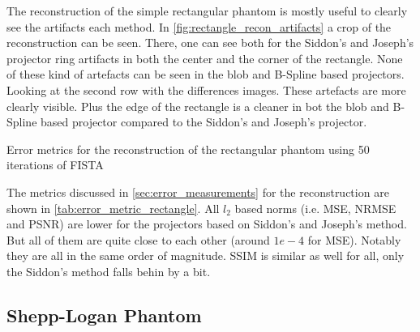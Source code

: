The reconstruction of the simple rectangular phantom is mostly useful to clearly see the artifacts
each method. In \autoref{fig:rectangle_recon_artifacts} a crop of the reconstruction can be seen.
There, one can see both for the Siddon's and Joseph's projector ring artifacts in both the center
and the corner of the rectangle. None of these kind of artefacts can be seen in the blob and
B-Spline based projectors. Looking at the second row with the differences images. These artefacts
are more clearly visible. Plus the edge of the rectangle is a cleaner in bot the blob and B-Spline
based projector compared to the Siddon's and Joseph's projector.

\begin{table}[h]%
	\centering
	\caption{Error metrics for the reconstruction of the rectangular phantom using 50 iterations
		of FISTA}%
	\label{tab:error_metric_rectangle}
\end{table}

The metrics discussed in \autoref{sec:error_measurements} for the reconstruction are shown in
\autoref{tab:error_metric_rectangle}. All \(l_2\) based norms (i.e. \gls{MSE}, \gls{NRMSE} and
\gls{PSNR}) are lower for the projectors based on Siddon's and Joseph's method. But all of them are
quite close to each other (around \(1e-4\) for \gls{MSE}). Notably they are all in the same order of
magnitude. \gls{SSIM} is similar as well for all, only the Siddon's method falls behin by a bit.

\subsection{Shepp-Logan Phantom}

